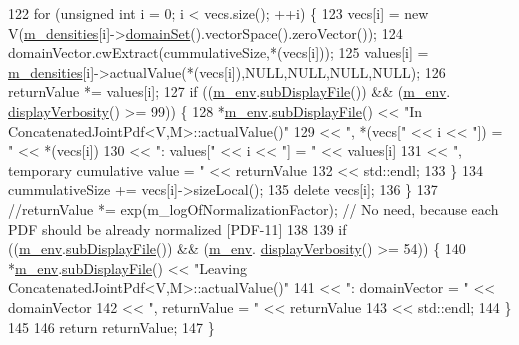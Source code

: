 \begin{DoxyCode}
122   \textcolor{keywordflow}{for} (\textcolor{keywordtype}{unsigned} \textcolor{keywordtype}{int} i = 0; i < vecs.size(); ++i) \{
123     vecs[i] = \textcolor{keyword}{new} V(\hyperlink{class_q_u_e_s_o_1_1_concatenated_joint_pdf_a42ee130daadf7ceb0d1745011f5b1169}{m\_densities}[i]->\hyperlink{class_q_u_e_s_o_1_1_base_scalar_function_ad0937628825249dd36ded3ce0c7959ac}{domainSet}().vectorSpace().zeroVector());
124     domainVector.cwExtract(cummulativeSize,*(vecs[i]));
125     values[i] = \hyperlink{class_q_u_e_s_o_1_1_concatenated_joint_pdf_a42ee130daadf7ceb0d1745011f5b1169}{m\_densities}[i]->actualValue(*(vecs[i]),NULL,NULL,NULL,NULL);
126     returnValue *= values[i];
127     \textcolor{keywordflow}{if} ((\hyperlink{class_q_u_e_s_o_1_1_base_scalar_function_adf44141aeb765d97613286f88f235f04}{m\_env}.\hyperlink{class_q_u_e_s_o_1_1_base_environment_a8a0064746ae8dddfece4229b9ad374d6}{subDisplayFile}()) && (\hyperlink{class_q_u_e_s_o_1_1_base_scalar_function_adf44141aeb765d97613286f88f235f04}{m\_env}.
      \hyperlink{class_q_u_e_s_o_1_1_base_environment_a1fe5f244fc0316a0ab3e37463f108b96}{displayVerbosity}() >= 99)) \{
128       *\hyperlink{class_q_u_e_s_o_1_1_base_scalar_function_adf44141aeb765d97613286f88f235f04}{m\_env}.\hyperlink{class_q_u_e_s_o_1_1_base_environment_a8a0064746ae8dddfece4229b9ad374d6}{subDisplayFile}() << \textcolor{stringliteral}{"In ConcatenatedJointPdf<V,M>::actualValue()"}
129                               << \textcolor{stringliteral}{", *(vecs["} << i << \textcolor{stringliteral}{"]) = "}       << *(vecs[i])
130                               << \textcolor{stringliteral}{": values["} << i << \textcolor{stringliteral}{"] = "}        << values[i]
131                               << \textcolor{stringliteral}{", temporary cumulative value = "} << returnValue
132                               << std::endl;
133     \}
134     cummulativeSize += vecs[i]->sizeLocal();
135     \textcolor{keyword}{delete} vecs[i];
136   \}
137   \textcolor{comment}{//returnValue *= exp(m\_logOfNormalizationFactor); // No need, because each PDF should be already
       normalized [PDF-11]}
138 
139   \textcolor{keywordflow}{if} ((\hyperlink{class_q_u_e_s_o_1_1_base_scalar_function_adf44141aeb765d97613286f88f235f04}{m\_env}.\hyperlink{class_q_u_e_s_o_1_1_base_environment_a8a0064746ae8dddfece4229b9ad374d6}{subDisplayFile}()) && (\hyperlink{class_q_u_e_s_o_1_1_base_scalar_function_adf44141aeb765d97613286f88f235f04}{m\_env}.
      \hyperlink{class_q_u_e_s_o_1_1_base_environment_a1fe5f244fc0316a0ab3e37463f108b96}{displayVerbosity}() >= 54)) \{
140     *\hyperlink{class_q_u_e_s_o_1_1_base_scalar_function_adf44141aeb765d97613286f88f235f04}{m\_env}.\hyperlink{class_q_u_e_s_o_1_1_base_environment_a8a0064746ae8dddfece4229b9ad374d6}{subDisplayFile}() << \textcolor{stringliteral}{"Leaving ConcatenatedJointPdf<V,M>::actualValue()"}
141                             << \textcolor{stringliteral}{": domainVector = "} << domainVector
142                             << \textcolor{stringliteral}{", returnValue = "}  << returnValue
143                             << std::endl;
144   \}
145 
146   \textcolor{keywordflow}{return} returnValue;
147 \}
\end{DoxyCode}
